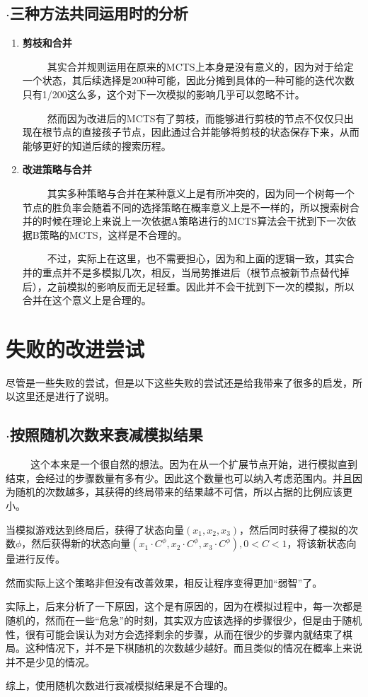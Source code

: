 \documentclass[9pt,twocolumn,twoside]{osajnl}
\begin{document}
\subsection{$\cdot$三种方法共同运用时的分析}
\begin{adjustwidth}{2em}{}	
	\begin{enumerate}
		\item \textbf{剪枝和合并}
		 
		 \ \ \ \ \ 其实合并规则运用在原来的MCTS上本身是没有意义的，因为对于给定一个状态，其后续选择是200种可能，因此分摊到具体的一种可能的迭代次数只有1/200这么多，这个对下一次模拟的影响几乎可以忽略不计。
		 
		\ \ \ \ \ 然而因为改进后的MCTS有了剪枝，而能够进行剪枝的节点不仅仅只出现在根节点的直接孩子节点，因此通过合并能够将剪枝的状态保存下来，从而能够更好的知道后续的搜索历程。
		\item \textbf{改进策略与合并}
		
		\ \ \ \ \ 其实多种策略与合并在某种意义上是有所冲突的，因为同一个树每一个节点的胜负率会随着不同的选择策略在概率意义上是不一样的，所以搜索树合并的时候在理论上来说上一次依据A策略进行的MCTS算法会干扰到下一次依据B策略的MCTS，这样是不合理的。
		
		\ \ \ \ \ 不过，实际上在这里，也不需要担心，因为和上面的逻辑一致，其实合并的重点并不是多模拟几次，相反，当局势推进后（根节点被新节点替代掉后），之前模拟的影响反而无足轻重。因此并不会干扰到下一次的模拟，所以合并在这个意义上是合理的。
		
	\end{enumerate}
	
	
\end{adjustwidth}
\section{失败的改进尝试}
尽管是一些失败的尝试，但是以下这些失败的尝试还是给我带来了很多的启发，所以这里还是进行了说明。
\subsection{$\cdot$按照随机次数来衰减模拟结果}
\begin{adjustwidth}{2em}{}	
	\ \ \ \ \
	这个本来是一个很自然的想法。因为在从一个扩展节点开始，进行模拟直到结束，会经过的步骤数量有多有少。因此这个数量也可以纳入考虑范围内。并且因为随机的次数越多，其获得的终局带来的结果越不可信，所以占据的比例应该更小。
	
	当模拟游戏达到终局后，获得了状态向量$(x_1,x_2,x_3)$，然后同时获得了模拟的次数$\phi$，然后获得新的状态向量$(x_1\cdot C^\phi, x_2\cdot C^\phi , x_3 \cdot C^\phi), 0<C<1$，将该新状态向量进行反传。
	
	然而实际上这个策略非但没有改善效果，相反让程序变得更加“弱智”了。
	
	实际上，后来分析了一下原因，这个是有原因的，因为在模拟过程中，每一次都是随机的，然而在一些“危急”的时刻，其实双方应该选择的步骤很少，但是由于随机性，很有可能会误认为对方会选择剩余的步骤，从而在很少的步骤内就结束了棋局。这种情况下，并不是下棋随机的次数越少越好。而且类似的情况在概率上来说并不是少见的情况。
	
	综上，使用随机次数进行衰减模拟结果是不合理的。
	
\end{adjustwidth}
\end{document}

